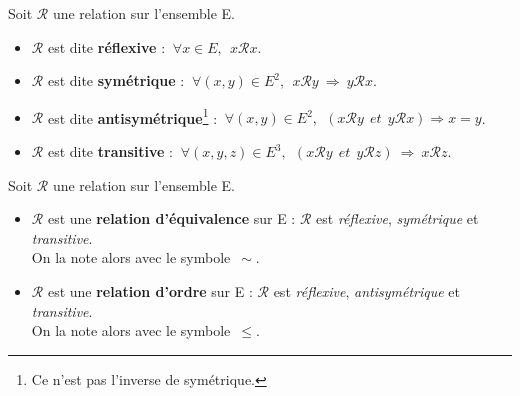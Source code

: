 \noindent
Soit \(\mathcal{R}\) une relation sur l'ensemble E.
\vspace{0.1cm}
\begin{itemize}[label=•]
    \item \(\mathcal{R}\) est dite \textbf{réflexive} \ssi : \(\ \forall x \in E,\ \ x\mathcal{R}x\).\vspace{0.1cm}
    
    \item \(\mathcal{R}\) est dite \textbf{symétrique} \ssi : \(\ \forall(x,y)\in E^2,\ \  x\mathcal{R}y \ \Rightarrow \ y\mathcal{R}x\).\vspace{0.1cm}
    
     \item \(\mathcal{R}\) est dite \textbf{antisymétrique}\footnote{Ce n'est pas l'inverse de symétrique.} \ssi : \(\ \forall(x,y)\in E^2,\ \  \left( x\mathcal{R}y\ \ et\ \ y\mathcal{R}x \right) \Rightarrow x=y\).\vspace{0.1cm}
     
     \item \(\mathcal{R}\) est dite \textbf{transitive} \ssi : \(\ \forall(x,y,z)\in E^3,\ \  \left( x\mathcal{R}y\ \ et\ \ y\mathcal{R}z \right)\ \Rightarrow\ x\mathcal{R}z\).
\end{itemize}

\vspace{0.8cm}

\noindent
Soit \(\mathcal{R}\) une relation sur l'ensemble E.
\begin{itemize}[leftmargin=0cm, label=•]
    \item \(\mathcal{R}\) est une \textbf{relation d'équivalence} sur E \ssi : \(\mathcal{R}\) est \emph{réflexive}, \emph{symétrique} et \emph{transitive}. \\
    On la note alors avec le symbole \(\, \sim\).\vspace{0.1cm}
    
    \item \(\mathcal{R}\) est une \textbf{relation d'ordre} sur E \ssi : \(\mathcal{R}\) est \emph{réflexive}, \emph{antisymétrique} et \emph{transitive}. \\
    On la note alors avec le symbole \(\, \leq\).
\end{itemize}

\vspace{1cm}

